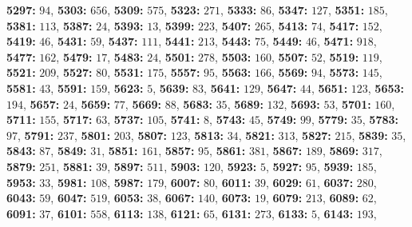 \textsf{\bfseries 5297:} $94$, \textsf{\bfseries 5303:} $656$, \textsf{\bfseries 5309:} $575$, \textsf{\bfseries 5323:} $271$, \textsf{\bfseries 5333:} $86$, \textsf{\bfseries 5347:} $127$, \textsf{\bfseries 5351:} $185$, \textsf{\bfseries 5381:} $113$, \textsf{\bfseries 5387:} $24$, \textsf{\bfseries 5393:} $13$, \textsf{\bfseries 5399:} $223$, \textsf{\bfseries 5407:} $265$, \textsf{\bfseries 5413:} $74$, \textsf{\bfseries 5417:} $152$, \textsf{\bfseries 5419:} $46$, \textsf{\bfseries 5431:} $59$, \textsf{\bfseries 5437:} $111$, \textsf{\bfseries 5441:} $213$, \textsf{\bfseries 5443:} $75$, \textsf{\bfseries 5449:} $46$, \textsf{\bfseries 5471:} $918$, \textsf{\bfseries 5477:} $162$, \textsf{\bfseries 5479:} $17$, \textsf{\bfseries 5483:} $24$, \textsf{\bfseries 5501:} $278$, \textsf{\bfseries 5503:} $160$, \textsf{\bfseries 5507:} $52$, \textsf{\bfseries 5519:} $119$, \textsf{\bfseries 5521:} $209$, \textsf{\bfseries 5527:} $80$, \textsf{\bfseries 5531:} $175$, \textsf{\bfseries 5557:} $95$, \textsf{\bfseries 5563:} $166$, \textsf{\bfseries 5569:} $94$, \textsf{\bfseries 5573:} $145$, \textsf{\bfseries 5581:} $43$, \textsf{\bfseries 5591:} $159$, \textsf{\bfseries 5623:} $5$, \textsf{\bfseries 5639:} $83$, \textsf{\bfseries 5641:} $129$, \textsf{\bfseries 5647:} $44$, \textsf{\bfseries 5651:} $123$, \textsf{\bfseries 5653:} $194$, \textsf{\bfseries 5657:} $24$, \textsf{\bfseries 5659:} $77$, \textsf{\bfseries 5669:} $88$, \textsf{\bfseries 5683:} $35$, \textsf{\bfseries 5689:} $132$, \textsf{\bfseries 5693:} $53$, \textsf{\bfseries 5701:} $160$, \textsf{\bfseries 5711:} $155$, \textsf{\bfseries 5717:} $63$, \textsf{\bfseries 5737:} $105$, \textsf{\bfseries 5741:} $8$, \textsf{\bfseries 5743:} $45$, \textsf{\bfseries 5749:} $99$, \textsf{\bfseries 5779:} $35$, \textsf{\bfseries 5783:} $97$, \textsf{\bfseries 5791:} $237$, \textsf{\bfseries 5801:} $203$, \textsf{\bfseries 5807:} $123$, \textsf{\bfseries 5813:} $34$, \textsf{\bfseries 5821:} $313$, \textsf{\bfseries 5827:} $215$, \textsf{\bfseries 5839:} $35$, \textsf{\bfseries 5843:} $87$, \textsf{\bfseries 5849:} $31$, \textsf{\bfseries 5851:} $161$, \textsf{\bfseries 5857:} $95$, \textsf{\bfseries 5861:} $381$, \textsf{\bfseries 5867:} $189$, \textsf{\bfseries 5869:} $317$, \textsf{\bfseries 5879:} $251$, \textsf{\bfseries 5881:} $39$, \textsf{\bfseries 5897:} $511$, \textsf{\bfseries 5903:} $120$, \textsf{\bfseries 5923:} $5$, \textsf{\bfseries 5927:} $95$, \textsf{\bfseries 5939:} $185$, \textsf{\bfseries 5953:} $33$, \textsf{\bfseries 5981:} $108$, \textsf{\bfseries 5987:} $179$, \textsf{\bfseries 6007:} $80$, \textsf{\bfseries 6011:} $39$, \textsf{\bfseries 6029:} $61$, \textsf{\bfseries 6037:} $280$, \textsf{\bfseries 6043:} $59$, \textsf{\bfseries 6047:} $519$, \textsf{\bfseries 6053:} $38$, \textsf{\bfseries 6067:} $140$, \textsf{\bfseries 6073:} $19$, \textsf{\bfseries 6079:} $213$, \textsf{\bfseries 6089:} $62$, \textsf{\bfseries 6091:} $37$, \textsf{\bfseries 6101:} $558$, \textsf{\bfseries 6113:} $138$, \textsf{\bfseries 6121:} $65$, \textsf{\bfseries 6131:} $273$, \textsf{\bfseries 6133:} $5$, \textsf{\bfseries 6143:} $193$, 
